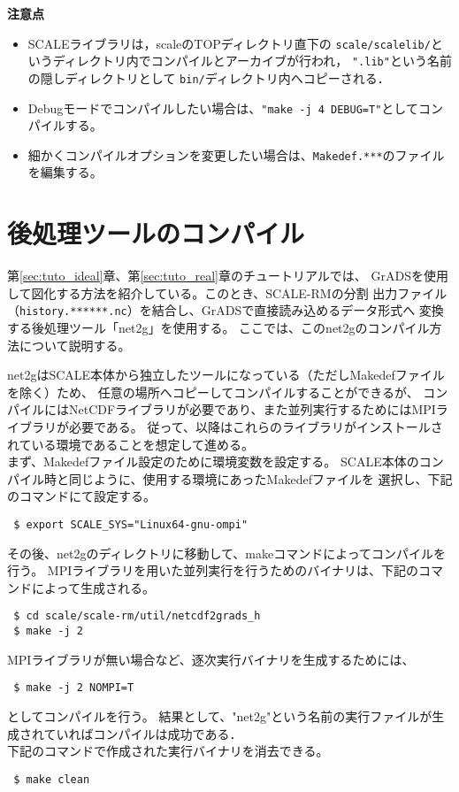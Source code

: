 {\bf 注意点}
\begin{itemize}
\item SCALEライブラリは，scaleのTOPディレクトリ直下の
 \verb|scale/scalelib/|というディレクトリ内でコンパイルとアーカイブが行われ，
 \verb|".lib"|という名前の隠しディレクトリとして
 \verb|bin/|ディレクトリ内へコピーされる．
\item Debugモードでコンパイルしたい場合は、\verb|"make -j 4 DEBUG=T"|としてコンパイルする。
\item 細かくコンパイルオプションを変更したい場合は、\verb|Makedef.***|のファイルを編集する。
\end{itemize}


\section{後処理ツールのコンパイル} \label{sec:source_net2g}

第\ref{sec:tuto_ideal}章、第\ref{sec:tuto_real}章のチュートリアルでは、
GrADSを使用して図化する方法を紹介している。このとき、SCALE-RMの分割
出力ファイル（\verb|history.******.nc|）を結合し、GrADSで直接読み込めるデータ形式へ
変換する後処理ツール「net2g」を使用する。
ここでは、このnet2gのコンパイル方法について説明する。

net2gはSCALE本体から独立したツールになっている（ただしMakedefファイルを除く）ため、
任意の場所へコピーしてコンパイルすることができるが、
コンパイルにはNetCDFライブラリが必要であり、また並列実行するためにはMPIライブラリが必要である。
従って、以降はこれらのライブラリがインストールされている環境であることを想定して進める。\\


まず、Makedefファイル設定のために環境変数を設定する。
SCALE本体のコンパイル時と同じように、使用する環境にあったMakedefファイルを
選択し、下記のコマンドにて設定する。

\begin{verbatim}
 $ export SCALE_SYS="Linux64-gnu-ompi"
\end{verbatim}

その後、net2gのディレクトリに移動して、makeコマンドによってコンパイルを行う。
MPIライブラリを用いた並列実行を行うためのバイナリは、下記のコマンドによって生成される。
\begin{verbatim}
 $ cd scale/scale-rm/util/netcdf2grads_h
 $ make -j 2
\end{verbatim}
MPIライブラリが無い場合など、逐次実行バイナリを生成するためには、\\
\begin{verbatim}
 $ make -j 2 NOMPI=T
\end{verbatim}
としてコンパイルを行う。
結果として、"net2g"という名前の実行ファイルが生成されていればコンパイルは成功である．\\

下記のコマンドで作成された実行バイナリを消去できる。
\begin{verbatim}
 $ make clean
\end{verbatim}


